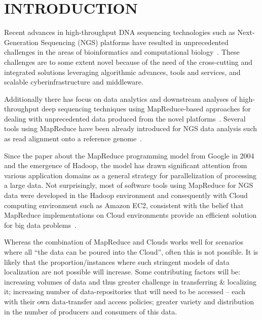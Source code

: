 \documentclass{acm_proc_article-sp}
\begin{document}
\section{INTRODUCTION} 

Recent advances in high-throughput DNA sequencing technologies such as
Next-Generation Sequencing (NGS) platforms have resulted in
unprecedented challenges in the areas of bioinformatics and
computational
biology~\cite{metzker2010,1000genome,wang2009-natrevgen,alex2009,mcpherson2009}.
These challenges are to some extent novel because of the need of the
cross-cutting and integrated solutions leveraging algorithmic
advances, tools and services, and scalable cyberinfrastructure and
middleware.



Additionally there has focus on data analytics and downstream analyses
of high-throughput deep sequencing techniques using MapReduce-based
approaches for dealing with unprecedented data produced from the novel
platforms~\cite{schatz-nature-biotech-2010}.  Several tools using
MapReduce have been already introduced for NGS data analysis such as
read alignment onto a reference genome~\cite{cloudburst,
  gatk,langmead2009,seal2011,langmead2010, taylor2010}.

Since the paper about the MapReduce programming model from Google in
2004~\cite{mapreduce-2004-dean} and the emergence of Hadoop, the model
has drawn significant attention from various application domains as a
general strategy for parallelization of processing a large data.  Not
surprisingly, most of software tools using MapReduce for NGS data were
developed in the Hadoop environment and consequently with Cloud
computing environment such as Amazon EC2, consistent with the belief
that MapReduce implementations on Cloud environments provide an
efficient solution for big data
problems~\cite{mapreduce-2004-dean,schatz-nature-biotech-2010,
  taylor2010}.

Whereas the combination of MapReduce and Clouds works well for
scenarios where all ``the data can be poured into the Cloud'', often
this is not possible.  It is likely that the proportion/instances
where such stringent models of data localization are not possible will
increase.  Some contributing factors will be: increasing volumes of
data and thus greater challenge in transferring \& localizing it;
increasing number of data-repositories that will need to be accessed
-- each with their own data-transfer and access policies; greater
variety and distribution in the number of producers and consumers of
this data.
\end{document}
